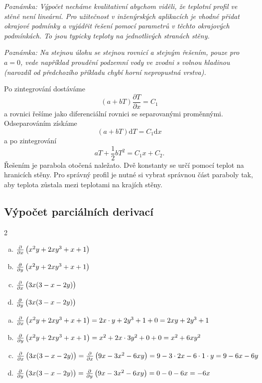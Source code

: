 \textit{Poznámka: Výpočet necháme kvalitativní abychom viděli, že teplotní profil ve stěně není lineární. Pro užitečnost v inženýrských aplikacích je vhodné přidat okrajové podmínky a vyjádřit řešení pomocí parametrů v těchto okrajových podmínkách. To jsou typicky teploty na jednotlivých stranách stěny.}

\textit{Poznámka: Na stejnou úlohu se stejnou rovnicí a stejným řešením, pouze pro $a=0$, vede například proudění podzemní vody ve zvodni s volnou hladinou (narozdíl od předchozího příkladu chybí horní nepropustná vrstva).}

\reseni
Po zintegrování dostáváme
$$(a+bT)\frac{\partial T}{\partial x}=C_1$$
a rovnici řešíme jako diferenciální rovnici se separovanými proměnnými.
Odseparováním získáme
$$(a+bT)\mathrm dT=C_1\mathrm dx$$
a po zintegrování
$$aT+\frac 12bT^2 = C_1x+C_2.$$
Řešením je
parabola otočená naležato. Dvě konstanty se určí pomocí teplot na hranicích stěny. Pro správný profil je nutné si vybrat
správnou část paraboly tak, aby teplota zůstala mezi teplotami na
krajích stěny.
\konec


\subsection{Výpočet  parciálních derivací}

\newcommand\pd[2][x]{\frac{\partial }{\partial #1}\left(\vphantom {\frac 22}#2\right)}
\begin{multicols}2
\begin{enumerate}[a)]
\item $\pd{x^2y+2xy^3+x+1}$
\item $\pd[y]{x^2y+2xy^3+x+1}$
\item $\pd{3x(3-x-2y)}$
\item $\pd[y]{3x(3-x-2y)}$
\end{enumerate}
\end{multicols}

\reseni
\begin{enumerate}[a)]
\item $\pd{x^2y+2xy^3+x+1}=2x\cdot y+2y^3+1+0=2xy+2y^3+1$
\item $\pd[y]{x^2y+2xy^3+x+1}=x^2+2x\cdot 3y^2+0+0=x^2+6xy^2$
\item $\pd{3x(3-x-2y)}=\pd{9x-3x^2-6xy}=9-3\cdot 2x-6\cdot 1\cdot y=9-6x-6y$
\item $\pd[y]{3x(3-x-2y)}=\pd[y]{9x-3x^2-6xy}=0-0-6x=-6x$
\end{enumerate}

\konec

